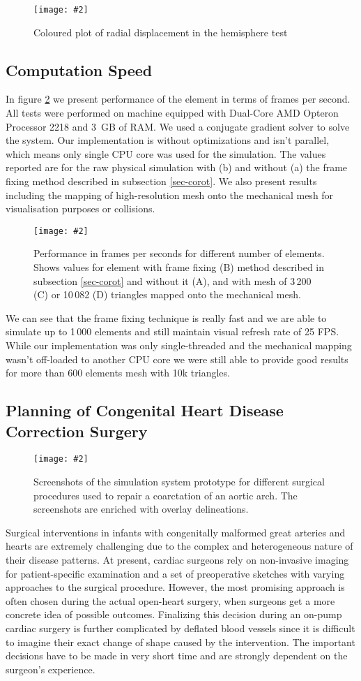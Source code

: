 \documentclass{egpubl}
\newcommand{\Figure}[3]{%
\begin{figure}[htb]
  \centering
  \texttt{[image: \#2]}
  \caption{\label{fig-#2}#3}
\end{figure}}
\newcommand{\FigureW}[3]{%
\begin{figure*}[htb]
  \centering
  \texttt{[image: \#2]}
  \caption{\label{fig-#2}#3}
\end{figure*}}
\begin{document}
\Figure{\linewidth}{hemisphere-img}
{Coloured plot of radial displacement in the hemisphere test}


\subsection{Computation Speed}\label{sec-fps} %

In figure \ref{fig-fps} we present performance of the element in terms of
frames per second. All tests were performed on machine equipped with Dual-Core
AMD Opteron Processor 2218 and 3~GB of RAM. We used a conjugate gradient solver
to solve the system. Our implementation is without optimizations
and isn't parallel, which means only single CPU core was used for the
simulation. The values reported are for the raw physical simulation with (b)
and without (a) the frame fixing method described in subsection
\ref{sec-corot}. We also present results including the mapping of
high-resolution mesh onto the mechanical mesh for visualisation purposes or
collisions.

\Figure{\linewidth}{fps}
{Performance in frames per seconds for different number of elements. Shows
values for element with frame fixing (B) method described in subsection
\ref{sec-corot} and without it (A), and with mesh of 3\,200
(C) or 10\,082 (D) triangles mapped onto the mechanical mesh.}

We can see that the frame fixing technique is really fast and we are able
to simulate up to 1\,000 elements and still maintain visual refresh rate of
25 FPS. While our implementation was only single-threaded and the mechanical mapping
wasn't off-loaded to another CPU core we were still able to provide good
results for more than 600 elements mesh with 10k triangles.



\subsection{Planning of Congenital Heart Disease Correction Surgery} %

\FigureW{0.75\linewidth}{chd}
{Screenshots of the simulation system prototype for different surgical
procedures used to repair a coarctation of an aortic arch. The screenshots
are enriched with overlay delineations.}

Surgical interventions in infants with congenitally malformed great arteries
and hearts are extremely challenging due to the complex and heterogeneous
nature of their disease patterns. At present, cardiac surgeons rely on
non-invasive imaging for patient-specific examination and a set of preoperative
sketches with varying approaches to the surgical procedure. However, the most
promising approach is often chosen during the actual open-heart surgery, when
surgeons get a more concrete idea of possible outcomes. Finalizing this
decision during an on-pump cardiac surgery is further complicated by deflated
blood vessels since it is difficult to imagine their exact change of shape
caused by the intervention. The important decisions have to be made in very
short time and are strongly dependent on the surgeon's experience.
\end{document}
